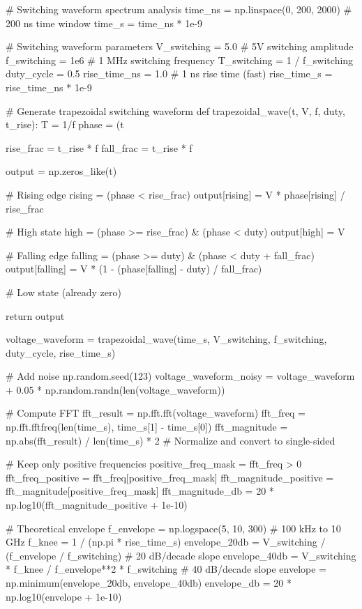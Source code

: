 \documentclass[11pt,a4paper]{article}
\begin{document}
\begin{pycode}
# Switching waveform spectrum analysis
time_ns = np.linspace(0, 200, 2000)  # 200 ns time window
time_s = time_ns * 1e-9

# Switching waveform parameters
V_switching = 5.0  # 5V switching amplitude
f_switching = 1e6  # 1 MHz switching frequency
T_switching = 1 / f_switching
duty_cycle = 0.5
rise_time_ns = 1.0  # 1 ns rise time (fast)
rise_time_s = rise_time_ns * 1e-9

# Generate trapezoidal switching waveform
def trapezoidal_wave(t, V, f, duty, t_rise):
    T = 1/f
    phase = (t %

    rise_frac = t_rise * f
    fall_frac = t_rise * f

    output = np.zeros_like(t)

    # Rising edge
    rising = (phase < rise_frac)
    output[rising] = V * phase[rising] / rise_frac

    # High state
    high = (phase >= rise_frac) & (phase < duty)
    output[high] = V

    # Falling edge
    falling = (phase >= duty) & (phase < duty + fall_frac)
    output[falling] = V * (1 - (phase[falling] - duty) / fall_frac)

    # Low state (already zero)

    return output

voltage_waveform = trapezoidal_wave(time_s, V_switching, f_switching, duty_cycle, rise_time_s)

# Add noise
np.random.seed(123)
voltage_waveform_noisy = voltage_waveform + 0.05 * np.random.randn(len(voltage_waveform))

# Compute FFT
fft_result = np.fft.fft(voltage_waveform)
fft_freq = np.fft.fftfreq(len(time_s), time_s[1] - time_s[0])
fft_magnitude = np.abs(fft_result) / len(time_s) * 2  # Normalize and convert to single-sided

# Keep only positive frequencies
positive_freq_mask = fft_freq > 0
fft_freq_positive = fft_freq[positive_freq_mask]
fft_magnitude_positive = fft_magnitude[positive_freq_mask]
fft_magnitude_db = 20 * np.log10(fft_magnitude_positive + 1e-10)

# Theoretical envelope
f_envelope = np.logspace(5, 10, 300)  # 100 kHz to 10 GHz
f_knee = 1 / (np.pi * rise_time_s)
envelope_20db = V_switching / (f_envelope / f_switching)  # 20 dB/decade slope
envelope_40db = V_switching * f_knee / f_envelope**2 * f_switching  # 40 dB/decade slope
envelope = np.minimum(envelope_20db, envelope_40db)
envelope_db = 20 * np.log10(envelope + 1e-10)


\end{pycode}
\end{document}
